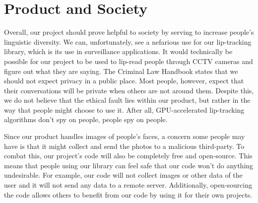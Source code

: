 \section{Product and Society}
Overall, our project should prove helpful to society by serving to increase people's linguistic diversity. We can, unfortunately, see a nefarious use for our lip-tracking library, which is its use in surveillance applications. It would technically be possible for our project to be used to lip-read people through CCTV cameras and figure out what they are saying. The Criminal Law Handbook states that we should not expect privacy in a public place. Most people, however, expect that their conversations will be private when others are not around them. Despite this, we do not believe that the ethical fault lies within our product, but rather in the way that people might choose to use it. After all, GPU-accelerated lip-tracking algorithms don't spy on people, people spy on people. 

Since our product handles images of people's faces, a concern some people may have is that it might collect and send the photos to a malicious third-party. To combat this, our project's code will also be completely free and open-source. This means that people using our library can feel safe that our code won't do anything undesirable. For example, our code will not collect images or other data of the user and it will not send any data to a remote server. Additionally, open-sourcing the code allows others to benefit from our code by using it for their own projects.
